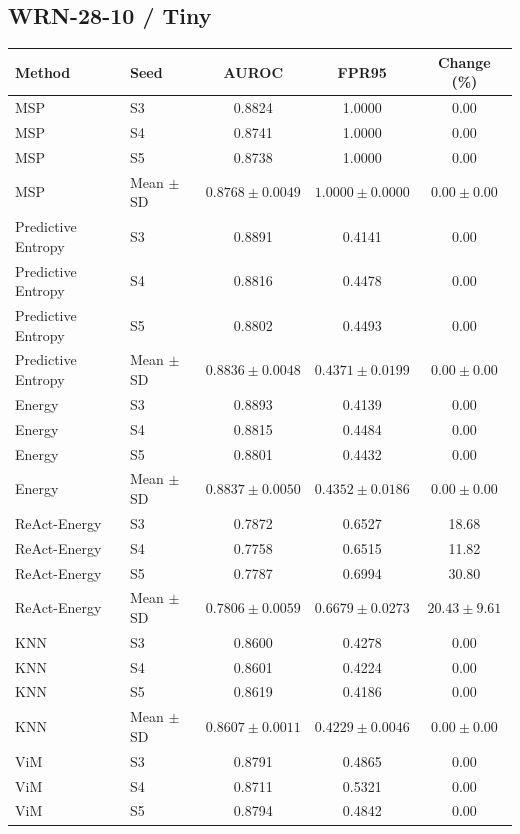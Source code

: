 \subsection*{WRN-28-10 / Tiny}
\begingroup
\footnotesize
\setlength{\tabcolsep}{3pt}
\renewcommand{\arraystretch}{1.1}
\begin{longtable}{@{}llccc@{}}
\toprule
Method & Seed & AUROC & FPR95 & Change (\%) \\
\midrule
\endhead
\bottomrule
\endlastfoot
MSP & S3 & 0.8824 & 1.0000 & 0.00 \\
MSP & S4 & 0.8741 & 1.0000 & 0.00 \\
MSP & S5 & 0.8738 & 1.0000 & 0.00 \\
MSP & Mean $\pm$ SD & $0.8768 \pm 0.0049$ & $1.0000 \pm 0.0000$ & $0.00 \pm 0.00$ \\
Predictive Entropy & S3 & 0.8891 & 0.4141 & 0.00 \\
Predictive Entropy & S4 & 0.8816 & 0.4478 & 0.00 \\
Predictive Entropy & S5 & 0.8802 & 0.4493 & 0.00 \\
Predictive Entropy & Mean $\pm$ SD & $0.8836 \pm 0.0048$ & $0.4371 \pm 0.0199$ & $0.00 \pm 0.00$ \\
Energy & S3 & 0.8893 & 0.4139 & 0.00 \\
Energy & S4 & 0.8815 & 0.4484 & 0.00 \\
Energy & S5 & 0.8801 & 0.4432 & 0.00 \\
Energy & Mean $\pm$ SD & $0.8837 \pm 0.0050$ & $0.4352 \pm 0.0186$ & $0.00 \pm 0.00$ \\
ReAct-Energy & S3 & 0.7872 & 0.6527 & 18.68 \\
ReAct-Energy & S4 & 0.7758 & 0.6515 & 11.82 \\
ReAct-Energy & S5 & 0.7787 & 0.6994 & 30.80 \\
ReAct-Energy & Mean $\pm$ SD & $0.7806 \pm 0.0059$ & $0.6679 \pm 0.0273$ & $20.43 \pm 9.61$ \\
KNN & S3 & 0.8600 & 0.4278 & 0.00 \\
KNN & S4 & 0.8601 & 0.4224 & 0.00 \\
KNN & S5 & 0.8619 & 0.4186 & 0.00 \\
KNN & Mean $\pm$ SD & $0.8607 \pm 0.0011$ & $0.4229 \pm 0.0046$ & $0.00 \pm 0.00$ \\
ViM & S3 & 0.8791 & 0.4865 & 0.00 \\
ViM & S4 & 0.8711 & 0.5321 & 0.00 \\
ViM & S5 & 0.8794 & 0.4842 & 0.00 \\

\end{longtable}
